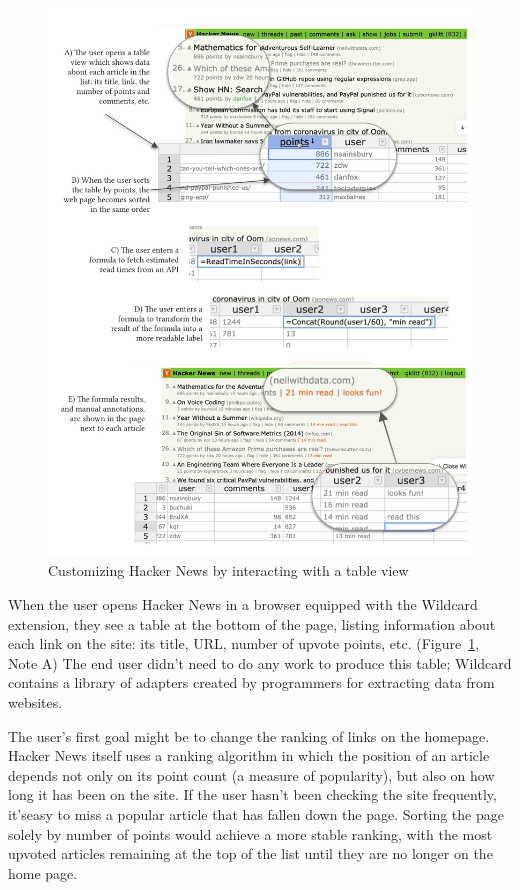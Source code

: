 \documentclass[sigplan,screen,10pt,anonymous,review]{acmart}
\begin{document}
\begin{figure}
\hypertarget{fig:hacker-news}{%
\centering
\includegraphics[width=\textwidth]{media/hacker-news.png}
\caption{Customizing Hacker News by interacting with a table view}\label{fig:hacker-news}
}
\end{figure}

When the user opens Hacker News in a browser equipped with the Wildcard
extension, they see a table at the bottom of the page, listing
information about each link on the site: its title, URL, number of
upvote points, etc. (Figure~\ref{fig:hacker-news}, Note A) The end user
didn't need to do any work to produce this table; Wildcard contains a
library of adapters created by programmers for extracting data from
websites.

The user's first goal might be to change the ranking of links on the
homepage. Hacker News itself uses a ranking algorithm in which the
position of an article depends not only on its point count (a measure of
popularity), but also on how long it has been on the site. If the user
hasn't been checking the site frequently, it'seasy to miss a popular
article that has fallen down the page. Sorting the page solely by number
of points would achieve a more stable ranking, with the most upvoted
articles remaining at the top of the list until they are no longer on
the home page.
\end{document}
